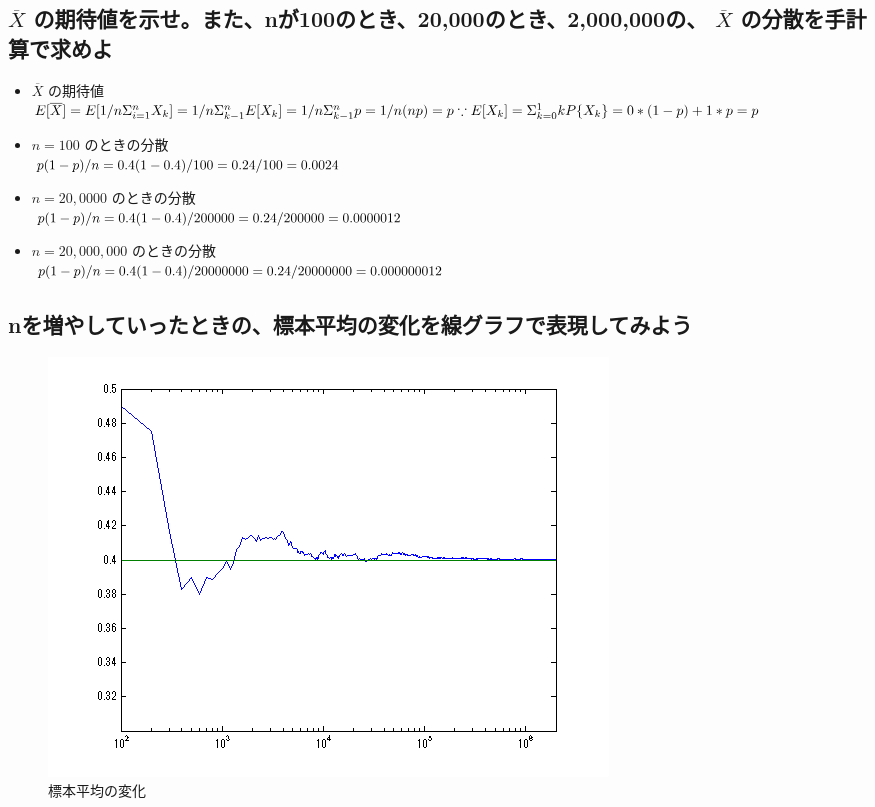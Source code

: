 \documentclass{scrartcl}
\begin{document}
\subsection{\(\overline{X}\) の期待値を示せ。また、nが100のとき、20,000のとき、2,000,000の、 \(\overline{X}\) の分散を手計算で求めよ}
\label{sec:org99976a1}
\begin{itemize}
\item \(\overline{X}\) の期待値\\
\(E[\overline{X}]
     = E[1/n{\Sigma^{n}_{i=1}{X_k}}] \\
     = 1/n {\Sigma^{n}_{k-1}E[X_k]} \\
     = 1/n {\Sigma^{n}_{k-1}p}\\
     = 1/n (n p) \\
     = p \\
     \because
     E[X_k]
     = \Sigma_{k=0}^{1}kP\{X_k\} \\ 
     = 0 * (1-p) + 1 * p \\
     = p\)\\
\item \(n = 100\) のときの分散\\
\(p(1-p)/n
     = 0.4(1-0.4)/100 \\
     = 0.24/100 \\
     = 0.0024\)\\
\item \(n = 20,0000\) のときの分散\\
\(p(1-p)/n
     = 0.4(1-0.4)/200000 \\
     = 0.24/200000 \\
     = 0.0000012\)     \\
\item \(n = 20,000,000\) のときの分散\\
\(p(1-p)/n
     = 0.4(1-0.4)/20000000 \\
     = 0.24/20000000 \\
     = 0.000000012\)          \\
\end{itemize}
\subsection{nを増やしていったときの、標本平均の変化を線グラフで表現してみよう}
\label{sec:org91f96ee}
\begin{figure}[htbp]
\centering
\includegraphics[width=0.5\linewidth]{./kadai/k2/k22.png}
\caption{標本平均の変化}
\end{figure}
\end{document}
